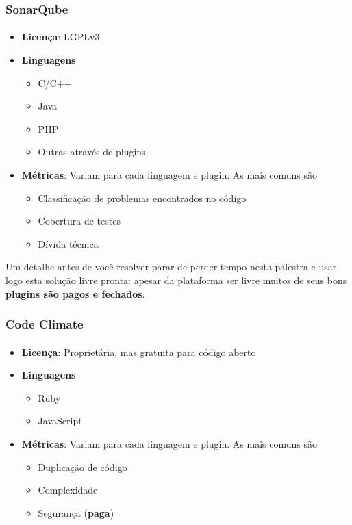 \documentclass{beamer}
\begin{document}
\begin{frame}
  \frametitle{SonarQube}
  \framesubtitle{}

  \begin{itemize}
    \item \textbf{Licença}: LGPLv3
    \item \textbf{Linguagens}
      \begin{itemize}
        \item C/C++
        \item Java
        \item PHP
        \item Outras através de plugins
      \end{itemize}
    \item \textbf{Métricas}: Variam para cada linguagem e plugin. As mais comuns são
      \begin{itemize}
        \item Classificação de problemas encontrados no código
        \item Cobertura de testes
        \item Dívida técnica
      \end{itemize}
  \end{itemize}

  Um detalhe antes de você resolver parar de perder tempo nesta palestra e usar logo esta solução livre pronta: apesar da plataforma ser livre muitos de seus bons \textbf{plugins são pagos e fechados}.
\end{frame}

\begin{frame}
  \frametitle{Code Climate}
  \framesubtitle{}

  \begin{itemize}
    \item \textbf{Licença}: Proprietária, mas gratuita para código aberto
    \item \textbf{Linguagens}
      \begin{itemize}
        \item Ruby
        \item JavaScript
      \end{itemize}
    \item \textbf{Métricas}: Variam para cada linguagem e plugin. As mais comuns são
      \begin{itemize}
        \item Duplicação de código
        \item Complexidade
        \item Segurança (\textbf{paga})
      \end{itemize}
  \end{itemize}
\end{frame}
\end{document}
